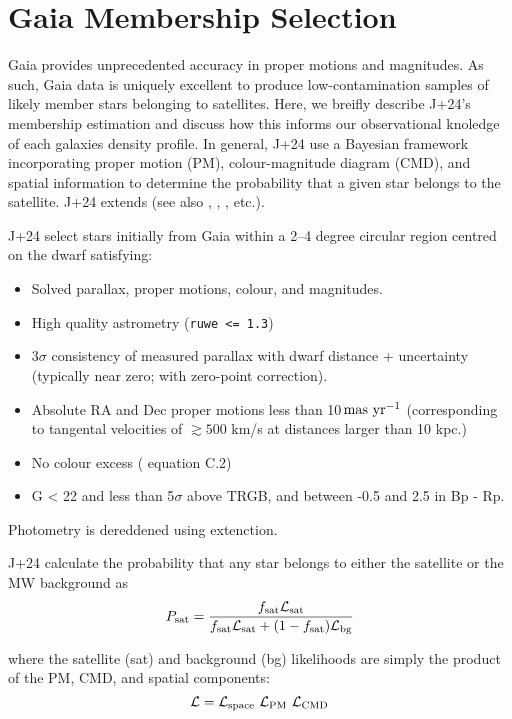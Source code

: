 \section{Gaia Membership Selection}\label{gaia-membership-selection}

Gaia provides unprecedented accuracy in proper motions and magnitudes.
As such, Gaia data is uniquely excellent to produce low-contamination
samples of likely member stars belonging to satellites. Here, we breifly
describe J+24's membership estimation and discuss how this informs our
observational knoledge of each galaxies density profile. In general,
J+24 use a Bayesian framework incorporating proper motion (PM),
colour-magnitude diagram (CMD), and spatial information to determine the
probability that a given star belongs to the satellite. J+24 extends
\citet{MV2020a} (see also \citet{pace+li2019}, \citet{battaglia+2022},
\citet{pace+erkal+li2022}, etc.).

J+24 select stars initially from Gaia within a 2--4 degree circular
region centred on the dwarf satisfying:

\begin{itemize}
\tightlist
\item
  Solved parallax, proper motions, colour, and magnitudes.
\item
  High quality astrometry (\texttt{ruwe\ \textless{}=\ 1.3})
\item
  3\(\sigma\) consistency of measured parallax with dwarf distance +
  uncertainty (typically near zero; with \citet{lindegren+2018}
  zero-point correction).
\item
  Absolute RA and Dec proper motions less than
  10\(\,{\rm mas\ yr^{-1}}\) (corresponding to tangental velocities of
  \(\gtrsim 500\) km/s at distances larger than 10 kpc.)
\item
  No colour excess (\citet{lindegren+2018} equation C.2)
\item
  G \textless{} 22 and less than 5\(\sigma\) above TRGB, and between
  -0.5 and 2.5 in Bp - Rp.
\end{itemize}

Photometry is dereddened using \citet{schlegel+1988} extenction.

J+24 calculate the probability that any star belongs to either the
satellite or the MW background as \[
P_{\rm sat} = \frac{f_{\rm sat}{\cal L}_{\rm sat}}{f_{\rm sat}{\cal L}_{\rm sat} + (1-f_{\rm sat}){\cal L}_{\rm bg}}
\]

where the satellite (sat) and background (bg) likelihoods are simply the
product of the PM, CMD, and spatial components: \[
{\cal L} = {\cal L}_{\rm space}\ {\cal L}_{\rm PM}\ {\cal L}_{\rm CMD}
\]

